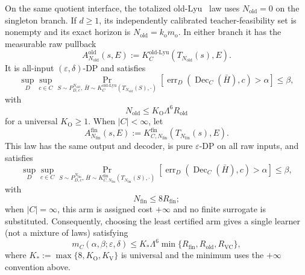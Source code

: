 \begin{theorem}
On the same quotient interface, the totalized old-Lyu~\citep{lyu2025} law
uses $N_{\mathrm{old}}=0$ on the singleton branch. If $d\ge1$, its
independently calibrated teacher-feasibility set is nonempty and its exact
horizon is $N_{\mathrm{old}}=k_{\mathrm o}m_{\mathrm o}$. In either branch
it has the measurable raw pullback
\[
 A_{N_{\mathrm{old}}}^{\mathrm{old}}(s,E)
 :=K_C^{\mathrm{old\text{-}Lyu}}(T_{N_{\mathrm{old}}}(s),E).
\]
It is all-input $(\varepsilon,\delta)$-DP and satisfies
\[
 \sup_D\sup_{c\in C}
 \Pr_{S\sim P_{D,c}^{N_{\mathrm{old}}},\,
 \bar H\sim K_C^{\mathrm{old\text{-}Lyu}}
 (T_{N_{\mathrm{old}}}(S),\cdot)}
 \left[\operatorname{err}_D(\operatorname{Dec}_C(\bar H),c)>\alpha\right]
 \le\beta,
\]
with
\[
 N_{\mathrm{old}}\le K_{\mathrm O}\Lambda^{6}R_{\mathrm{old}}
\]
for a universal $K_{\mathrm O}\ge1$. When $|C|<\infty$, let
\[
 A_{N_{\mathrm{fin}}}^{\mathrm{fin}}(s,E)
 :=K_{C,N_{\mathrm{fin}}}^{\mathrm{fin}}
 (T_{N_{\mathrm{fin}}}(s),E).
\]
This law has the same output and decoder, is pure $\varepsilon$-DP on all
raw inputs, and satisfies
\[
 \sup_D\sup_{c\in C}
 \Pr_{S\sim P_{D,c}^{N_{\mathrm{fin}}},\,
 \bar H\sim K_{C,N_{\mathrm{fin}}}^{\mathrm{fin}}
 (T_{N_{\mathrm{fin}}}(S),\cdot)}
 \left[\operatorname{err}_D(\operatorname{Dec}_C(\bar H),c)>\alpha\right]
 \le\beta,
\]
with
\[
 N_{\mathrm{fin}}\le 8R_{\mathrm{fin}};
\]
when $|C|=\infty$, this arm is assigned cost $+\infty$ and no finite
surrogate is substituted.  Consequently, choosing the least certified arm
gives a single learner (not a mixture of laws) satisfying
\[
 m_C(\alpha,\beta;\varepsilon,\delta)
 \le K_*\Lambda^{6}\min\{R_{\mathrm{fin}},R_{\mathrm{old}},R_{\mathrm{VC}}\},
\]
where $K_*:=\max\{8,K_{\mathrm O},K_{\mathrm V}\}$ is universal and the minimum uses the
$+\infty$ convention above.
\end{theorem}

